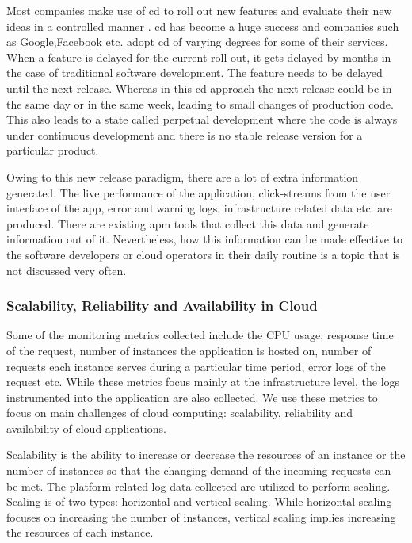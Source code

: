 \documentclass[article,type=msc,colorback,12pt,accentcolor=tud8b,table]{tudthesis}
\begin{document}
		Most companies make use of \gls{cd} to roll out new features and evaluate their new ideas in a controlled manner \cite{kohavi2007practical}. \gls{cd} has become a huge success and companies such as Google,Facebook etc. adopt \gls{cd} of varying degrees for some of their services. When a feature is delayed for the current roll-out, it gets delayed by months in the case of traditional software development. The feature needs to be delayed until the next release. Whereas in this \gls{cd} approach the next release could be in the same day or in the same week, leading to small changes of production code. This also leads to a state called perpetual development where the code is always under continuous development and there is no stable release version for a particular product.  	\par Owing to this new release paradigm, there are a lot of extra information generated. The live performance of the application, click-streams from the user interface of the app, error and warning logs, infrastructure related data etc. are produced. There are existing \gls{apm} tools that collect this data and generate information out of it. Nevertheless, how this information can be made effective to the software developers or cloud operators in their daily routine is a topic that is not discussed very often. 
		
		\subsubsection{Scalability, Reliability  and Availability in Cloud}
		
		Some of the monitoring metrics collected include the CPU usage, response time of the request, number of instances the application is hosted on, number of requests each instance serves during a particular time period, error logs of the request etc. While these metrics focus mainly at the infrastructure level, the logs instrumented into the application are also collected. We use these metrics to focus on main challenges of cloud computing: scalability, reliability and availability of cloud applications.
		
		\par Scalability is the ability to increase or decrease the resources of an instance or the number of instances so that the changing demand of the incoming requests can be met. The platform related log data collected are utilized to perform scaling. Scaling is of two types: horizontal and vertical scaling. While horizontal scaling focuses on increasing the number of instances, vertical scaling implies increasing the resources of each instance.
		
\end{document}
